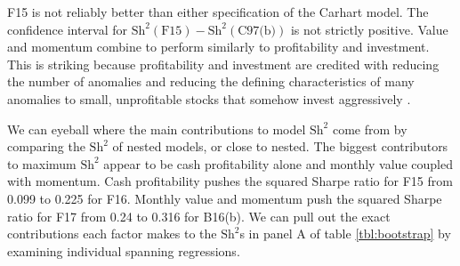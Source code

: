 F15 is not reliably better than either specification of the Carhart model. The confidence
interval for $\text{Sh}^2(\text{F15})-\text{Sh}^2(\text{C97(b)})$ is not strictly
positive. Value and momentum combine to perform similarly to profitability and investment.
This is striking because profitability and investment are credited with reducing the
number of anomalies and reducing the defining characteristics of many anomalies to small,
unprofitable stocks that somehow invest aggressively \parencite{fama2015five,
fama2016dissecting}.

We can eyeball where the main contributions to model $\text{Sh}^2$ come from by comparing
the $\text{Sh}^2$ of nested models, or close to nested. The biggest contributors to
maximum $\text{Sh}^2$ appear to be cash profitability alone and monthly value coupled with
momentum. Cash profitability pushes the squared Sharpe ratio for F15 from 0.099 to 0.225
for F16. Monthly value and momentum push the squared Sharpe ratio for F17 from 0.24 to
0.316 for B16(b). We can pull out the exact contributions each factor makes to the
$\text{Sh}^2$s in panel A of table \ref{tbl:bootstrap} by examining individual spanning
regressions.
